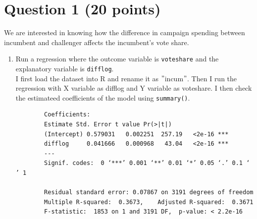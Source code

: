\documentclass[12pt,letterpaper]{article}
\begin{document}
\section*{Question 1 (20 points)}
\vspace{.25cm}
\noindent We are interested in knowing how the difference in campaign spending between incumbent and challenger affects the incumbent's vote share. 
	\begin{enumerate}
		\item Run a regression where the outcome variable is \texttt{voteshare} and the explanatory variable is \texttt{difflog}.\\	
		I first load the dataset into R and rename it as $"$incum$"$. Then I run the regression with X variable as difflog and Y variable as voteshare. I then check the estimateed coefficients of the model using \texttt{summary()}.\\
		  	
		\begin{footnotesize}
		
		\begin{verbatim}
		Coefficients:
		Estimate Std. Error t value Pr(>|t|)    
		(Intercept) 0.579031   0.002251  257.19   <2e-16 ***
		difflog     0.041666   0.000968   43.04   <2e-16 ***
		---
		Signif. codes:  0 ‘***’ 0.001 ‘**’ 0.01 ‘*’ 0.05 ‘.’ 0.1 ‘ ’ 1
		
		Residual standard error: 0.07867 on 3191 degrees of freedom
		Multiple R-squared:  0.3673,	Adjusted R-squared:  0.3671 
		F-statistic:  1853 on 1 and 3191 DF,  p-value: < 2.2e-16
		\end{verbatim}
	\end{footnotesize}
		

\end{enumerate}
\end{document}
